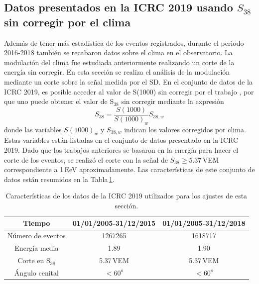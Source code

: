 	\subsection{Datos presentados en la ICRC 2019 usando $S_{38}$ sin corregir por el clima}

	Además de tener más estadística de los eventos registrados, durante el periodo 2016-2018 también se recabaron datos sobre el clima en el observatorio. La modulación del clima fue estudiada anteriormente realizando un corte de la energía sin corregir. En esta sección se realiza el análisis de la modulación mediante un  corte sobre la señal medida por el SD. En el conjunto de datos de la ICRC 2019, es posible acceder al valor de S(1000) sin corregir por el trabajo \cite{aab2017impact}, por que uno puede obtener el valor de S$_{38}$ sin corregir mediante la expresión
	\begin{equation}
		S_{38} = \frac{S(1000)}{S(1000)_w}S_{38,w}
		\label{eq:s38_w}
	\end{equation}
	donde las variables $S(1000)_w$ y $S_{38,w}$ indican los valores corregidos por clima. Estas variables están listadas en el conjunto de datos presentado en la ICRC 2019. Dado que los trabajos anteriores se basaron en la energía para hacer el corte de los eventos, se realizó el corte con la señal de $S_{38}\ge 5.37\,$VEM correspondiente a 1\,EeV aproximadamente. %
	Las características de este conjunto de datos están resumidos en la Tabla\,\ref{tabla:caracteristicas_ICRC_2019_S38}.
			\begin{table}[H]
				\centering
				\begin{tabular}{|c|c|c|}
				\hline
				\textbf{Tiempo }    & \textbf{01/01/2005-31/12/2015}  & \textbf{01/01/2005-31/12/2018 }\\ \hline 
				Número de eventos   &   1267265     		 &  1618717     		\\ \hline 
				Energía media       &  1.89        		 	 &  1.90        		\\ \hline 
				Corte en S$_{38}$ 	    &  5.37\,VEM   		 	 &  5.37\,VEM       	\\ \hline 
				Ángulo cenital 		&  $<60^o$ 			 	 & $<60^o$\\ \hline
				\end{tabular}
				\caption{Características de los datos de la ICRC 2019 utilizados para los ajustes de esta sección.} \label{tabla:caracteristicas_ICRC_2019_S38}
			\end{table}

